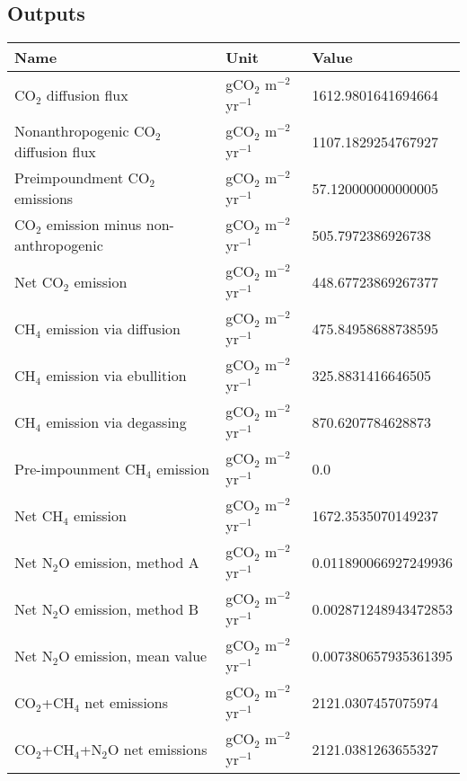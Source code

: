\documentclass{article}%
\begin{document}
%
\subsection{Outputs}%
\label{subsec:Outputs}%
\begin{center}%
\renewcommand{\arraystretch}{1.0}%
\begin{tabu}{@{}p{10cm} X[c] X[l]@{}}%
\toprule%
\textbf{Name}&\textbf{Unit}&\textbf{Value}\\%
\midrule%
CO$_2$ diffusion flux&gCO$_2$ m$^{-2}$ yr$^{-1}$&\num[round-precision=4,round-mode=figures]{1612.9801641694664}\\%
Nonanthropogenic CO$_2$ diffusion flux&gCO$_2$ m$^{-2}$ yr$^{-1}$&\num[round-precision=4,round-mode=figures]{1107.1829254767927}\\%
Preimpoundment CO$_2$ emissions&gCO$_2$ m$^{-2}$ yr$^{-1}$&\num[round-precision=4,round-mode=figures]{57.120000000000005}\\%
CO$_2$ emission minus non-anthropogenic&gCO$_2$ m$^{-2}$ yr$^{-1}$&\num[round-precision=4,round-mode=figures]{505.7972386926738}\\%
Net CO$_2$ emission&gCO$_2$ m$^{-2}$ yr$^{-1}$&\num[round-precision=4,round-mode=figures]{448.67723869267377}\\%
CH$_4$ emission via diffusion&gCO$_2$ m$^{-2}$ yr$^{-1}$&\num[round-precision=4,round-mode=figures]{475.84958688738595}\\%
CH$_4$ emission via ebullition&gCO$_2$ m$^{-2}$ yr$^{-1}$&\num[round-precision=4,round-mode=figures]{325.8831416646505}\\%
CH$_4$ emission via degassing&gCO$_2$ m$^{-2}$ yr$^{-1}$&\num[round-precision=4,round-mode=figures]{870.6207784628873}\\%
Pre-impounment CH$_4$ emission&gCO$_2$ m$^{-2}$ yr$^{-1}$&\num[round-precision=4,round-mode=figures]{0.0}\\%
Net CH$_4$ emission&gCO$_2$ m$^{-2}$ yr$^{-1}$&\num[round-precision=4,round-mode=figures]{1672.3535070149237}\\%
Net N$_2$O emission, method A&gCO$_2$ m$^{-2}$ yr$^{-1}$&\num[round-precision=4,round-mode=figures]{0.011890066927249936}\\%
Net N$_2$O emission, method B&gCO$_2$ m$^{-2}$ yr$^{-1}$&\num[round-precision=4,round-mode=figures]{0.002871248943472853}\\%
Net N$_2$O emission, mean value&gCO$_2$ m$^{-2}$ yr$^{-1}$&\num[round-precision=4,round-mode=figures]{0.007380657935361395}\\%
\midrule%
CO$_2$+CH$_4$ net emissions&gCO$_2$ m$^{-2}$ yr$^{-1}$&\num[round-precision=4,round-mode=figures]{2121.0307457075974}\\%
\midrule%
CO$_2$+CH$_4$+N$_2$O net emissions&gCO$_2$ m$^{-2}$ yr$^{-1}$&\num[round-precision=4,round-mode=figures]{2121.0381263655327}\\\bottomrule%
%
\end{tabu}%
\end{center}%
\end{document}
